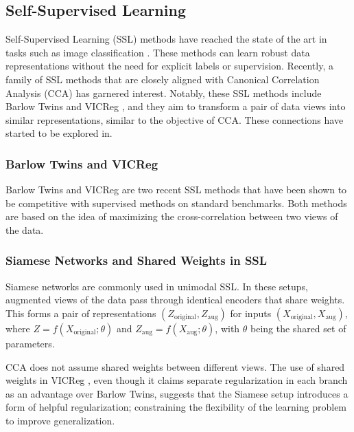\subsection{Self-Supervised Learning}

Self-Supervised Learning (SSL) methods have reached the state of the art in tasks such as image classification \citep{balestriero2023cookbook}. These methods can learn robust data representations without the need for explicit labels or supervision. Recently, a family of SSL methods that are closely aligned with Canonical Correlation Analysis (CCA) has garnered interest. Notably, these SSL methods include Barlow Twins \citep{zbontar2021barlow} and VICReg \citep{bardes2021vicreg}, and they aim to transform a pair of data views into similar representations, similar to the objective of CCA. These connections have started to be explored in\cite{balestriero2022contrastive}.

\subsubsection{Barlow Twins and VICReg}

Barlow Twins \citep{zbontar2021barlow} and VICReg \citep{bardes2021vicreg} are two recent SSL methods that have been shown to be competitive with supervised methods on standard benchmarks. Both methods are based on the idea of maximizing the cross-correlation between two views of the data.

\subsubsection{Siamese Networks and Shared Weights in SSL}
Siamese networks are commonly used in unimodal SSL. In these setups, augmented views of the data pass through identical encoders that share weights. This forms a pair of representations \( (Z_{\text{original}}, Z_{\text{aug}}) \) for inputs \( (X_{\text{original}}, X_{\text{aug}}) \), where \( Z = f(X_{\text{original}}; \theta) \) and \( Z_{\text{aug}} = f(X_{\text{aug}}; \theta) \), with \( \theta \) being the shared set of parameters.

CCA does not assume shared weights between different views. The use of shared weights in VICReg \cite{bardes2021vicreg}, even though it claims separate regularization in each branch as an advantage over Barlow Twins, suggests that the Siamese setup introduces a form of helpful regularization; constraining the flexibility of the learning problem to improve generalization.

